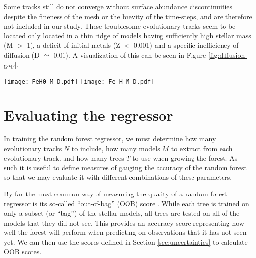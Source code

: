 \documentclass[manuscript,linenumbers]{aastex6}
\newif\ifref
\newcommand{\mb}[1]{\ifref\boldmath\textbf{#1}\unboldmath\else #1\fi}
\begin{document}
Some tracks still do not converge without surface abundance discontinuities despite the fineness of the mesh or the brevity of the time-steps, and are therefore not included in our study. These troublesome evolutionary tracks seem to be located only located in a thin ridge of models having sufficiently high stellar mass (M $>$ 1), a deficit of initial metals (Z $<$ 0.001) and a specific inefficiency of diffusion (D $\simeq$ 0.01). A visualization of this can be seen in Figure \ref{fig:diffusion-gap}.

\begin{figure*}
    \centering
    \texttt{[image: FeH0\_M\_D.pdf]}\hfill
    \texttt{[image: Fe\_H\_M\_D.pdf]}
    \caption{Stellar mass as a function of diffusion \mb{multiplication} factor colored by initial surface metallicity (left) and final surface metallicity (right). A ridge of \mb{missing points indicating} unconverged evolutionary tracks can be seen around a diffusion \mb{multiplication} factor of 0.01. Beyond this ridge, tracks that were initially metal-poor end their main-sequence lives with all of their metals drained from their surfaces. \label{fig:diffusion-gap} }
\end{figure*}



\section{Evaluating the regressor}
\label{sec:evaluation}
In training the random forest regressor, we must determine how many evolutionary tracks $N$ to include, how many models $M$ to extract from each evolutionary track, and how many trees $T$ to use when growing the forest. As such it is useful to define measures of gauging the accuracy of the random forest so that we may evaluate it with different combinations of these parameters. 

By far the most common way of measuring the quality of a random forest regressor is its so-called ``out-of-bag'' (OOB) score \citep[see e.g.\ section 3.1 of][]{breiman2001random}. While each tree is trained on only a subset (or ``bag'') of the stellar models, all trees are tested on all of the models that they did not see. This provides an accuracy score representing how well the forest will perform when predicting on observations that it has not seen yet. We can then use the scores defined in Section \ref{sec:uncertainties} to calculate OOB scores. 
\end{document}

